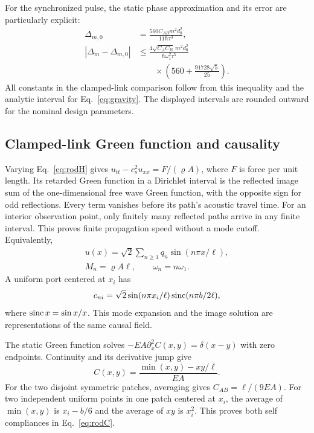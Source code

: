For the synchronized pulse, the static phase approximation and its error are particularly explicit:
\begin{equation}
\begin{split}
\Delta_{m,0}&=\frac{560C_{AB}m^2d_0^2}{11\hbar\tau^3},\\
|\Delta_m-\Delta_{m,0}|&\le\frac{4\sqrt{C_AC_B}\,m^2d_0^2}{\hbar\omega_1^2\tau^5}\\
&\qquad\times\left(560+\frac{91728\sqrt5}{25}\right).
\end{split}
\label{eq:explicitgap}
\end{equation}
All constants in the clamped-link comparison follow from this inequality and the analytic interval for Eq.~\eqref{eq:gravity}. The displayed intervals are rounded outward for the nominal design parameters.

\subsection{Clamped-link Green function and causality}
Varying Eq.~\eqref{eq:rodH} gives $u_{tt}-c_s^2u_{xx}=F/(\varrho A)$, where $F$ is force per unit length. Its retarded Green function in a Dirichlet interval is the reflected image sum of the one-dimensional free wave Green function, with the opposite sign for odd reflections. Every term vanishes before its path's acoustic travel time. For an interior observation point, only finitely many reflected paths arrive in any finite interval. This proves finite propagation speed without a mode cutoff. Equivalently,
\begin{equation}
\begin{gathered}
u(x)=\sqrt2\sum_{n\ge1}q_n\sin(n\pi x/\ell),\\
M_n=\varrho A\ell,\qquad\omega_n=n\omega_1.
\end{gathered}
\label{eq:rodmodes}
\end{equation}
A uniform port centered at $x_i$ has
\begin{equation}
c_{ni}=\sqrt2\sin(n\pi x_i/\ell)\sinc(n\pi b/2\ell),
\label{eq:patchmode}
\end{equation}
where $\operatorname{sinc} x=\sin x/x$. This mode expansion and the image solution are representations of the same causal field.

The static Green function solves $-EA\partial_x^2C(x,y)=\delta(x-y)$ with zero endpoints. Continuity and its derivative jump give
\begin{equation}
C(x,y)=\frac{\min(x,y)-xy/\ell}{EA}.
\label{eq:staticGreen}
\end{equation}
For the two disjoint symmetric patches, averaging gives $C_{AB}=\ell/(9EA)$. For two independent uniform points in one patch centered at $x_i$, the average of $\min(x,y)$ is $x_i-b/6$ and the average of $xy$ is $x_i^2$. This proves both self compliances in Eq.~\eqref{eq:rodC}.

